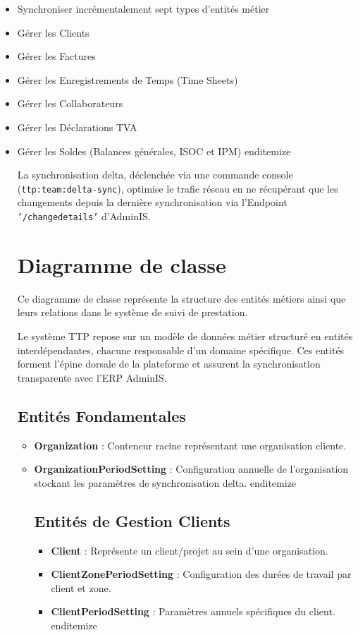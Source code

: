 \begin{itemize}
    \item Synchroniser incrémentalement sept types d'entités métier
    \item Gérer les Clients
    \item Gérer les Factures
    \item Gérer les Enregistrements de Temps (Time Sheets)
    \item Gérer les Collaborateurs
    \item Gérer les Déclarations TVA
    \item Gérer les Soldes (Balances générales, ISOC et IPM)
end{itemize}

La synchronisation delta, déclenchée via une commande console (\texttt{ttp:team:delta-sync}), optimise le trafic réseau en ne récupérant que les changements depuis la dernière synchronisation via l'Endpoint \texttt{'/changedetails'} d'AdminIS.

\section{Diagramme de classe}

Ce diagramme de classe représente la structure des entités métiers ainsi que leurs relations dans le système de suivi de prestation.

Le système TTP repose sur un modèle de données métier structuré en entités interdépendantes, chacune responsable d'un domaine spécifique. Ces entités forment l'épine dorsale de la plateforme et assurent la synchronisation transparente avec l'ERP AdminIS.

\subsection{Entités Fondamentales}

\begin{itemize}
    \item \textbf{Organization} : Conteneur racine représentant une organisation cliente.
    \item \textbf{OrganizationPeriodSetting} : Configuration annuelle de l'organisation stockant les paramètres de synchronisation delta.
end{itemize}

\subsection{Entités de Gestion Clients}

\begin{itemize}
    \item \textbf{Client} : Représente un client/projet au sein d'une organisation.
    \item \textbf{ClientZonePeriodSetting} : Configuration des durées de travail par client et zone.
    \item \textbf{ClientPeriodSetting} : Paramètres annuels spécifiques du client.
end{itemize}


\end{itemize}
\end{itemize}
\end{itemize}
